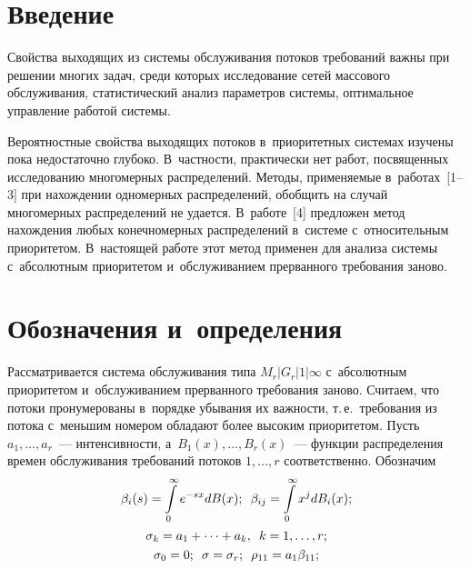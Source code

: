 
\vspace*{5pt}



\thispagestyle{headings}

\begin{multicols}{2}

\label{st\stat}

\section{Введение} 

Свойства выходящих из системы обслуживания потоков требований важны при решении многих задач, 
среди  которых исследование сетей массового обслуживания, статистический анализ параметров системы, 
оптимальное управление работой сис\-темы.

Вероятностные свойства выходящих потоков в~приоритетных системах изучены пока недостаточно глубоко. 
В~частности, практически нет работ, посвященных исследованию многомерных распределений. 
Методы, применяемые в~работах~[1--3] при нахождении одномерных распределений, обобщить на 
случай многомерных распределений не удается. В~работе~[4] предложен метод нахождения любых 
конечномерных распределений в~системе с~относительным приоритетом. В~настоящей работе 
этот метод применен для анализа системы с~абсолютным приоритетом и~обслуживанием  
прерванного требования заново.

\vspace*{-1pt}

\section{Обозначения и~определения}


Рассматривается система обслуживания типа $M_r|G_r|1|\infty$ с~абсолютным 
приоритетом и~обслуживанием  прерванного требования заново. Считаем, что 
потоки пронумерованы в~порядке убывания их важности, т.\,е.\ требования из потока с~меньшим 
номером обладают более высоким приоритетом.
Пусть $a_1,\ldots,a_r$~--- интенсивности, а~$B_1(x),\ldots,B_r(x)$~--- функции 
распределения времен обслуживания требований потоков $1,\ldots,r$ соответственно.  Обозначим
\begin{gather*}
  \beta_i(s)=\int\limits_0^{\infty}e^{-sx}dB(x);\enskip \beta_{ij}=\int\limits_0^{\infty}x^jdB_i(x);\\[1pt]
   \sigma_k=a_1+\cdots+a_k,\enskip k=1,\ldots,r;\\ \sigma_0=0;\enskip \sigma=\sigma_r;\enskip 
  \rho_{11}=a_1\beta_{11};
  \end{gather*}
  

\end{multicols}
